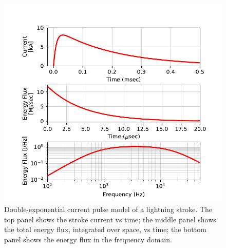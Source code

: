 \begin{figure}
\begin{center}
\includegraphics{figures/Lightning_spectra.pdf}

\caption[Time and frequency profiles of the lightning illumination model]{Double-exponential current pulse model of a lightning stroke. The top panel shows the stroke current vs time; the middle panel shows the total energy flux, integrated over space, vs time; the bottom panel shows the energy flux in the frequency domain.}
\label{fig:lightning_spectrum}
\end{center}
\end{figure}
